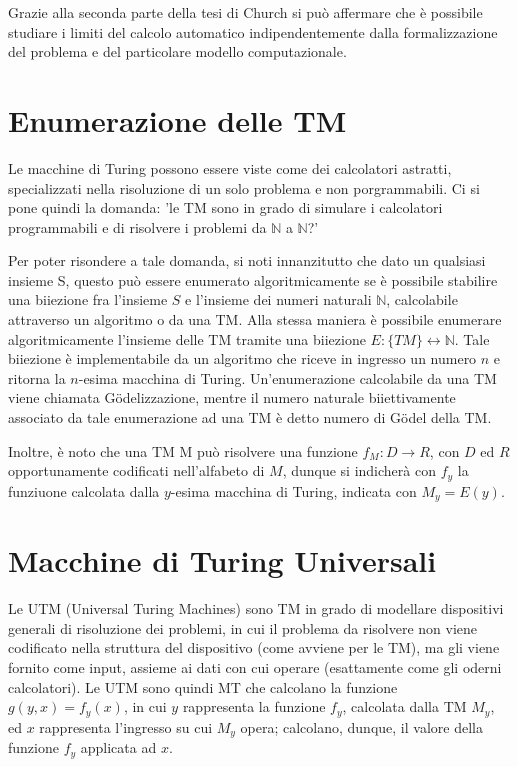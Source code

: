   Grazie alla seconda parte della tesi di Church si può affermare che è possibile studiare i limiti del calcolo automatico indipendentemente dalla formalizzazione del problema e del particolare modello computazionale.

  \section{Enumerazione delle TM}
  Le macchine di Turing possono essere viste come dei calcolatori astratti, specializzati nella risoluzione di un solo problema e non porgrammabili. Ci si pone quindi la domanda: 'le TM sono in grado di simulare i calcolatori programmabili e di risolvere i problemi da \(\mathbb{N}\) a \(\mathbb{N}\)?'

  Per poter risondere a tale domanda, si noti innanzitutto che dato un qualsiasi insieme S, questo può essere enumerato algoritmicamente se è possibile stabilire una biiezione fra l'insieme \(S\) e l'insieme dei numeri naturali \(\mathbb{N}\), calcolabile attraverso un algoritmo o da una TM.
  Alla stessa maniera è possibile enumerare algoritmicamente l'insieme delle TM tramite una biiezione \(E:\{TM\}\leftrightarrow\mathbb{N}\). Tale biiezione è implementabile da un algoritmo che riceve in ingresso un numero \(n\) e ritorna la \(n\)-esima macchina di Turing. Un'enumerazione calcolabile da una TM viene chiamata Gödelizzazione, mentre il numero naturale biiettivamente associato da tale enumerazione ad una TM è detto numero di Gödel della TM. 

  Inoltre, è noto che una TM M può risolvere una funzione \(f_M:D\to R\), con \(D\) ed \(R\) opportunamente codificati nell'alfabeto di \(M\), dunque si indicherà con \(f_y\) la funziuone calcolata dalla \(y\)-esima macchina di Turing, indicata con \(M_y=E(y)\).

  \section{Macchine di Turing Universali}
  Le UTM (Universal Turing Machines) sono TM in grado di modellare dispositivi generali di risoluzione dei problemi, in cui il problema da risolvere non viene codificato nella struttura del dispositivo (come avviene per le TM), ma gli viene fornito come input, assieme ai dati con cui operare (esattamente come gli oderni calcolatori). Le UTM sono quindi MT che calcolano la funzione \(g(y,x)=f_y(x)\), in cui \(y\) rappresenta la funzione \(f_y\), calcolata dalla TM \(M_y\), ed \(x\) rappresenta l'ingresso su cui \(M_y\) opera; calcolano, dunque, il valore della funzione \(f_y\) applicata ad \(x\).

